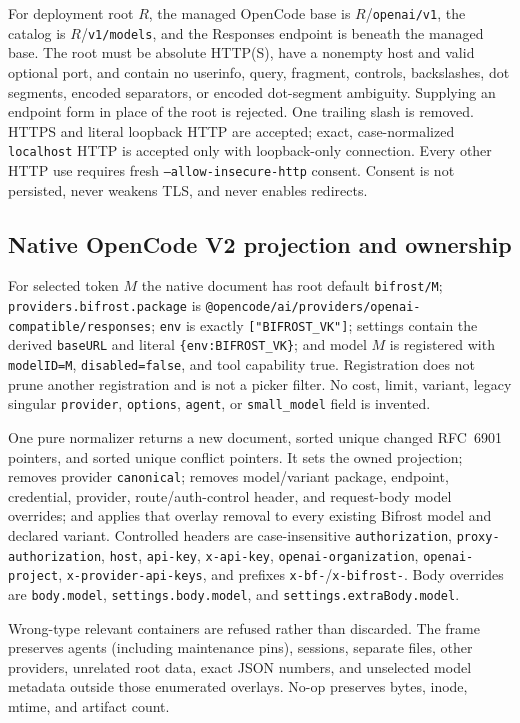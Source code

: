 \documentclass{article}
\begin{document}
For deployment root $R$, the managed OpenCode base is $R$/\texttt{openai/v1},
the catalog is $R$/\texttt{v1/models}, and the Responses endpoint is beneath the
managed base.  The root must be absolute HTTP(S), have a nonempty host and valid
optional port, and contain no userinfo, query, fragment, controls, backslashes,
dot segments, encoded separators, or encoded dot-segment ambiguity.  Supplying
an endpoint form in place of the root is rejected.  One trailing slash is
removed.  HTTPS and literal loopback HTTP are accepted; exact, case-normalized
\texttt{localhost} HTTP is accepted only with loopback-only connection.  Every
other HTTP use requires fresh \texttt{--allow-insecure-http} consent.  Consent
is not persisted, never weakens TLS, and never enables redirects.

\subsection{Native OpenCode V2 projection and ownership}

For selected token $M$ the native document has root default
\texttt{bifrost/M}; \texttt{providers.bifrost.package} is
\texttt{@opencode/ai/providers/openai-compatible/responses};
\texttt{env} is exactly \texttt{["BIFROST\_VK"]}; settings contain the derived
\texttt{baseURL} and literal \texttt{\{env:BIFROST\_VK\}}; and model $M$ is
registered with \texttt{modelID=M}, \texttt{disabled=false}, and tool
capability true.  Registration does not prune another registration and is not a
picker filter.  No cost, limit, variant, legacy singular \texttt{provider},
\texttt{options}, \texttt{agent}, or \texttt{small\_model} field is invented.

One pure normalizer returns a new document, sorted unique changed RFC~6901
pointers, and sorted unique conflict pointers.  It sets the owned projection;
removes provider \texttt{canonical}; removes model/variant package, endpoint,
credential, provider, route/auth-control header, and request-body model
overrides; and applies that overlay removal to every existing Bifrost model and
declared variant.  Controlled headers are case-insensitive
\texttt{authorization}, \texttt{proxy-authorization}, \texttt{host},
\texttt{api-key}, \texttt{x-api-key}, \texttt{openai-organization},
\texttt{openai-project}, \texttt{x-provider-api-keys}, and prefixes
\texttt{x-bf-}/\texttt{x-bifrost-}.  Body overrides are
\texttt{body.model}, \texttt{settings.body.model}, and
\texttt{settings.extraBody.model}.

Wrong-type relevant containers are refused rather than discarded.  The frame
preserves agents (including maintenance pins), sessions, separate files, other
providers, unrelated root data, exact JSON numbers, and unselected model
metadata outside those enumerated overlays.  No-op preserves bytes, inode,
mtime, and artifact count.
\end{document}

